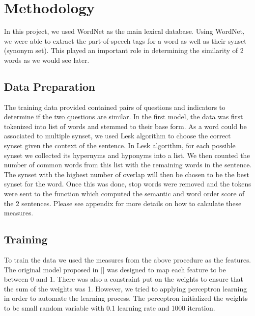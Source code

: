 \section{Methodology}
In this project, we used WordNet as the main lexical database. Using WordNet, we were able to extract the part-of-speech tags for a word as well as their synset (synonym set). This played an important role in determining the similarity of 2 words as we would see later.

\subsection{Data Preparation}
The training data provided contained pairs of questions and indicators to determine if the two questions are similar. In the first model, the data was first tokenized into list of words and stemmed to their base form. As a word could be associated to multiple synset, we used Lesk algorithm to choose the correct synset given the context of the sentence. In Lesk algorithm, for each possible synset we collected its hypernyms and hyponyms into  a list. We then counted the number of common words from this list with the remaining words in the sentence. The synset with the highest number of overlap will then be chosen to be the best synset for the word. Once this was done, stop words were removed and the tokens were sent to the function which computed the semantic and word order score of the 2 sentences. Please see appendix for more details on how to calculate these measures. 

\subsection{Training}
To train the data we used the measures from the above procedure as the features. The original model proposed in [] was designed to map each feature to be between 0 and 1. There was also a constraint put on the weights to ensure that the sum of the weights was 1. However, we tried to applying perceptron learning in order to automate the learning process. The perceptron initialized the weights to be small random variable with 0.1 learning rate and 1000 iteration.